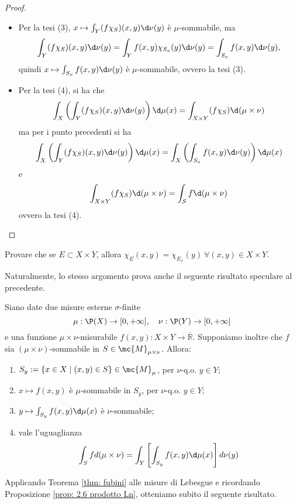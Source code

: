 \begin{proof}
\begin{itemize}
\begin{itemize}
            \item Per la tesi (3), \(x\mapsto \int_Y(f\chi_S)(x,y)\d\nu(y)\) è $\mu$-sommabile, ma 
            \[\int_Y(f\chi_S)(x,y)\d\nu(y) = \int_Yf(x,y)\chi_{S_x}(y)\d\nu(y) = \int_{S_x}f(x,y)\d\nu(y),\]
            quindi $x\mapsto \int_{S_x}f(x,y)\d\nu(y)$ è $\mu$-sommabile, ovvero la tesi (3).
            \item Per la tesi (4), si ha che
            \[\int_X\left(\int_Y(f\chi_S)(x,y)\d\nu(y)\right)\d\mu(x) = \int_{X\times Y}(f\chi_S)\d(\mu\times \nu)\]
            ma per i punto precedenti si ha 
            \[\int_X\left(\int_Y(f\chi_S)(x,y)\d\nu(y)\right)\d\mu(x) = \int_X\left(\int_{S_x}f(x,y)\d\nu(y)\right)\d\mu(x)\]
            e 
            \[\int_{X\times Y}(f\chi_S)\d(\mu\times \nu) = \int_Sf\d(\mu\times \nu)\]
            ovvero la tesi (4). \qedhere
        \end{itemize}
    \end{itemize}
\end{proof}
\begin{exc}\label{exc: fub1}
    Provare che se $E\subset X\times Y$, allora $\chi_E(x,y) = \chi_{E_x}(y)\ \forall (x,y)\in X\times Y$.
\end{exc}
Naturalmente, lo stesso argomento prova anche il seguente risultato speculare al precedente. 

\begin{shadedTheorem}[$\circ$]\label{thm: 2.10}
Siano date due misure esterne $\sigma$-finite
\[\mu: \P(X) \rightarrow[0,+\infty], \quad \nu: \P(Y) \rightarrow[0,+\infty]\]
e una funzione $\mu \times \nu$-misurabile $f(x, y): X \times Y \rightarrow \overline{\mathbb{R}}$. Supponiamo inoltre che $f$ sia $(\mu \times \nu)$-sommabile in $S \in \mc{M}_{\mu \times \nu}$. Allora:
\begin{enumerate}
    \item $S_{y}:=\{x \in X \mid(x, y) \in S\} \in \mc{M}_{\mu}$, per $\nu$-q.o. $y \in Y$;
    \item  $x \mapsto f(x, y)$ è $\mu$-sommabile in $S_{y}$, per $\nu$-q.o. $y \in Y$;
    \item $y \mapsto \int_{S_{y}} f(x, y) \d \mu(x)$ è $\nu$-sommabile;
    \item vale l'uguaglianza
    \[\int_{S} f d(\mu \times \nu)=\int_{Y}\left[\int_{S_{y}} f(x, y) \d \mu(x)\right] d \nu(y)\]
\end{enumerate}
\end{shadedTheorem}
Applicando Teorema \ref{thm: fubini} alle misure di Lebesgue e ricordando Proposizione \ref{prop: 2.6 prodotto Ln}, otteniamo subito il seguente risultato.

